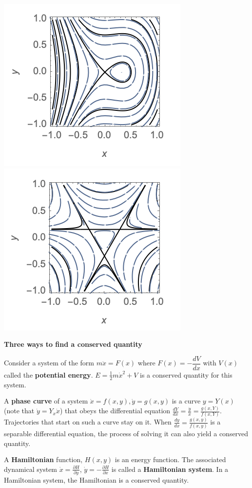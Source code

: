 \documentclass[12pt,letterpaper,noanswers]{exam}
\begin{document}
\includegraphics[scale=0.9]{img/C12homoclinic.png}
\includegraphics[scale=0.9]{img/C12heteroclinic.png}

\noindent\textbf{Three ways to find a conserved quantity}
\begin{tcolorbox}
Consider a system of the form $m\ddot x = F(x)$ where $F(x) = -\dfrac{dV}{dx}$ with $V(x)$ called the \textbf{potential energy}.  $E = \frac{1}{2}m\dot x^2 + V$ is a conserved quantity for this system.

A \textbf{phase curve} of a system $\dot x = f(x,y), \dot y = g(x,y)$ is a curve $y = Y(x)$ (note that $\dot y = Y_x \dot x$) that obeys the differential equation $\frac{dY}{dx} = \frac{\dot y}{\dot x} = \frac{g(x,Y)}{f(x,Y)}$.  Trajectories that start on such a curve stay on it.  When $\frac{dy}{dx} = \frac{g(x,y)}{f(x,y)}$ is a separable differential equation, the process of solving it can also yield a conserved quantity.

A \textbf{Hamiltonian} function, $H(x,y)$ is an energy function.  The associated dynamical system $\dot x = \frac{\partial H}{\partial y}$, $\dot y = -\frac{\partial H}{\partial x}$ is called a \textbf{Hamiltonian system}.  In a Hamiltonian system, the Hamiltonian is a conserved quantity.


\end{tcolorbox}
\end{document}
